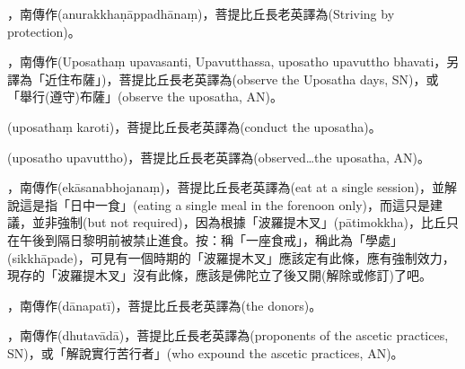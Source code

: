\startitemgroup[noteitems]
\item{}，南傳作(anurakkhaṇāppadhānaṃ)，菩提比丘長老英譯為(Striving by protection)。
\stopitemgroup

\startitemgroup[noteitems]
\item{}，南傳作(Uposathaṃ upavasanti, Upavutthassa, uposatho upavuttho bhavati，另譯為「近住布薩」)，菩提比丘長老英譯為(observe the Uposatha days, SN)，或「舉行(遵守)布薩」(observe the uposatha, AN)。
\item{}(uposathaṃ karoti)，菩提比丘長老英譯為(conduct the uposatha)。
\item{}(uposatho upavuttho)，菩提比丘長老英譯為(observed…the uposatha, AN)。
\stopitemgroup

\startitemgroup[noteitems]
\item{}，南傳作(ekāsanabhojanaṃ)，菩提比丘長老英譯為(eat at a single session)，並解說這是指「日中一食」(eating a single meal in the forenoon only)，而這只是建議，並非強制(but not required)，因為根據「波羅提木叉」(pātimokkha)，比丘只在午後到隔日黎明前被禁止進食。按：稱「一座食戒」，稱此為「學處」(sikkhāpade)，可見有一個時期的「波羅提木叉」應該定有此條，應有強制效力，現存的「波羅提木叉」沒有此條，應該是佛陀立了後又開(解除或修訂)了吧。
\stopitemgroup

\startitemgroup[noteitems]
\item{}，南傳作(dānapatī)，菩提比丘長老英譯為(the donors)。
\stopitemgroup

\startitemgroup[noteitems]
\item{}，南傳作(dhutavādā)，菩提比丘長老英譯為(proponents of the ascetic practices, SN)，或「解說實行苦行者」(who expound the ascetic practices, AN)。
\stopitemgroup

